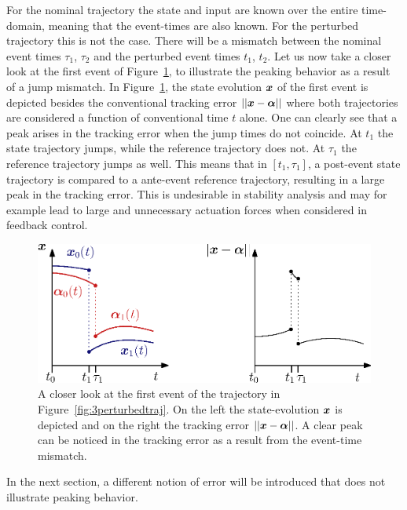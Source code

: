 \documentclass[../DC2017114Bouma.tex]{subfiles}
\begin{document}
For the nominal trajectory the state and input are known over the entire time-domain, meaning that the event-times are also known. For the perturbed trajectory this is not the case. There will be a mismatch between the nominal event times $\tau_1$, $\tau_2$ and the perturbed event times $t_1$, $t_2$. Let us now take a closer look at the first event of Figure~\ref{fig:3peakerror}, to illustrate the peaking behavior as a result of a jump mismatch. In Figure~\ref{fig:3peakerror}, the state evolution ${\boldsymbol{x}}$ of the first event is depicted besides the conventional tracking error $||{\boldsymbol{x}}-\boldsymbol{\alpha}||$ where both trajectories are considered a function of conventional time $t$ alone. One can clearly see that a peak arises in the tracking error when the jump times do not coincide. At $t_1$ the state trajectory jumps, while the reference trajectory does not. At $\tau_1$ the reference trajectory jumps as well. This means that in $[t_1,\tau_1]$, a post-event state trajectory is compared to a ante-event reference trajectory, resulting in a large peak in the tracking error. This is undesirable in stability analysis and may for example lead to large and unnecessary actuation forces when considered in feedback control.

\begin{figure}[h]
\centering
\includegraphics[width=.66\textwidth]{peakerror.eps}\caption{A closer look at the first event of the trajectory in Figure~\ref{fig:3perturbedtraj}. On the left the state-evolution ${\boldsymbol{x}}$ is depicted and on the right the tracking error $||{\boldsymbol{x}}-\boldsymbol{\alpha}||$. A clear peak can be noticed in the tracking error as a result from the event-time mismatch.} \label{fig:3peakerror}
\end{figure}

In the next section, a different notion of error will be introduced that does not illustrate peaking behavior.
%
%
%
%
%
\end{document}
